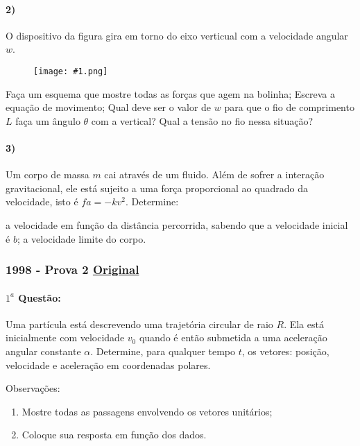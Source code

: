 \documentclass[12pt,a4paper]{article}
\newcommand{\original}[1]{\tiny \href{#1}{Original} \normalsize}
\newcommand{\imgh}[2]{\begin{figure}[h]
\centering
\texttt{[image: \#1.png]}
\end{figure}}
\begin{document}
\paragraph{2)} O dispositivo da figura gira em torno do eixo verticual com a velocidade angular $w$.

\imgh{fisicave21998q2}{4}

\begin{tasks}
\task Faça um esquema que mostre todas as forças que agem na bolinha;
\task Escreva a equação de movimento;
\task Qual deve ser o valor de $w$ para que o fio de comprimento $L$ faça um ângulo $\theta$ com a vertical?
\task Qual a tensão no fio nessa situação?
\end{tasks}



\paragraph{3)} Um corpo de massa $m$ cai através de um fluido. Além de sofrer a interação gravitacional, ele está sujeito a uma força proporcional ao quadrado da velocidade, isto é $fa = -kv^2$. Determine:
\begin{tasks}
\task a velocidade em função da distância percorrida, sabendo que a velocidade inicial é $b$;
\task a velocidade limite do corpo.
\end{tasks}

\newpage
\subsubsection{1998 - Prova 2  \original{https://drive.google.com/open?id=1V3W83_Yd0qJoUgovMUCDWM9U61O-a8lL}}


\paragraph{$1^a$ Questão:}

Uma partícula está descrevendo uma trajetória circular de raio $R$. Ela está inicialmente com velocidade $v_0$ quando é então
submetida a uma aceleração angular constante $\alpha$. Determine, para qualquer tempo $t$, os vetores: posição, velocidade e 
aceleração em coordenadas polares.

Observações:
\begin{enumerate}[label=\arabic*)]
\item Mostre todas as passagens envolvendo os vetores unitários;
\item Coloque sua resposta em função dos dados.
\end{enumerate}
\end{document}
